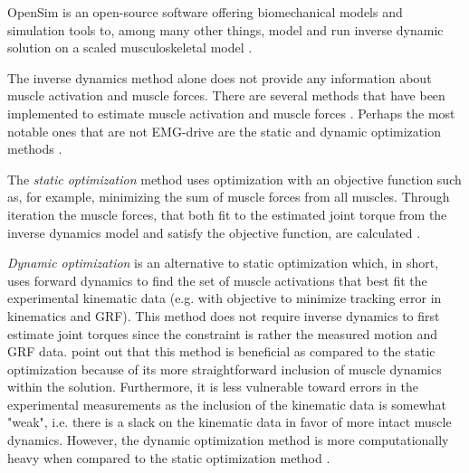 OpenSim \cite{Delp2007, Seth2018} is an open-source software offering biomechanical models and simulation tools to, among many other things, model and run inverse dynamic solution on a scaled musculoskeletal model \cite{Buchanan2004, Delp2007, Seth2018, Pizzolato2017}.

The inverse dynamics method alone does not provide any information about muscle activation and muscle forces.
There are several methods that have been implemented to estimate muscle activation and muscle forces \cite{Erdemir2007}.
Perhaps the most notable ones that are not \ac{EMG}-drive are the static and dynamic optimization methods \cite{Erdemir2007, Delp2007, Pizzolato2015}. 

The \textit{static optimization} method uses optimization with an objective function such as, for example, minimizing the sum of muscle forces from all muscles. 
Through iteration the muscle forces, that both fit to the estimated joint torque from the inverse dynamics model and satisfy the objective function, are calculated \cite{Erdemir2007}. 

\textit{Dynamic optimization} is an alternative to static optimization which, in short, uses forward dynamics to find the set of muscle activations that best fit the experimental kinematic data (e.g. with objective to minimize tracking error in kinematics and \ac{GRF}). 
This method does not require inverse dynamics to first estimate joint torques since the constraint is rather the measured motion and \ac{GRF} data.
\textcite{Erdemir2007} point out that this method is beneficial as compared to the static optimization because of its more straightforward inclusion of muscle dynamics within the solution.
Furthermore, it is less vulnerable toward errors in the experimental measurements as the inclusion of the kinematic data is somewhat "weak", i.e. there is a slack on the kinematic data in favor of more intact muscle dynamics.
However, the dynamic optimization method is more computationally heavy when compared to the static optimization method \cite{Erdemir2007}.

